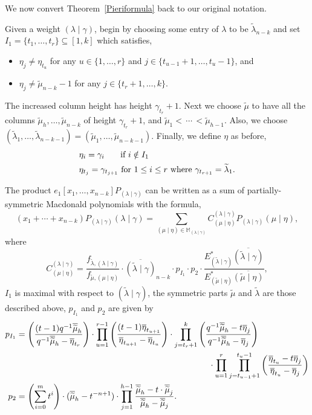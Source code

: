 \documentclass[ALCO]{cedram}
\newcommand{\Estar}[1]{E^*_{#1}}
\newcommand{\PP}{P_{(\lambda \mid \gamma)}}
\newcommand{\MMM}{\mathbb{M}_{\lambdagamma}}
\newcommand{\nudom}{{( \lambda \mid \gamma )}}
\newcommand{\lambdagamma}{{\nudom}}
\newcommand{\mueta}{{(\mu \mid \eta)}}
\newcommand{\mutilde}{{\widetilde{\mu}}}
\newcommand{\lambdatilde}{{\widetilde{\lambda}}}
\newcommand{\lambdatildegamma}{{(\lambdatilde \mid \gamma)}}
\newcommand{\mutildeeta}{{(\mutilde \mid \eta)}}
\newcommand{\hIone}{h}
\begin{document}
We now convert Theorem~\ref{Pieriformula} back to our original notation.

Given a weight $\lambdagamma$, begin by choosing some entry of $\lambda$ to be $\lambdatilde_{n-k}$ and set $I_1 = \{t_1, \dotsc, t_r\} \subseteq [1,k]$ which satisfies, 
\begin{itemize}
    \item $\eta_j \neq \eta_{t_u}$ for any $u \in \{1,\dotsc, r\}$ and $j \in \{t_{u-1}+1,\dotsc, t_{u}-1\}$, and
    \item $\eta_j \neq \mutilde_{n-k}-1$ for any $j \in \{t_r+1, \dotsc, k\}$.
\end{itemize}
The increased column height has height $\gamma_{t_r}+1$. Next we choose $\mutilde$ to have all the columns $\mutilde_{h} ,\dotsc, \mutilde_{n-k}$ of height $\gamma_{t_r}+1$, and $\mutilde_1 < \, \dotsm \, < \mutilde_{h-1}$. Also, we choose $(\lambdatilde_1, \dotsc, \lambdatilde_{n-k-1}) = (\mutilde_1, \dotsc, \mutilde_{n-k-1})$. Finally, we define $\eta$ as before,
 \begin{align}
     &\eta_i = \gamma_i \hspace*{.55cm}\text{ if } i\notin I_1\nonumber \\
     &\eta_{t_j}=\gamma_{t_{j+1}} \text{ for } 1\leq i \leq r \text{ where } \gamma_{t_{r+1}} = \lambdatilde_1.\label{eta}
 \end{align}

\begin{coro}\label{ourconventions}
 The product $e_1[x_1,\dotsc, x_{n-k}] \PP$ can be written as a sum of partially-symmetric Macdonald polynomials with the formula,
\[ (x_1 + \dotsm + x_{n-k})\PP{\lambdagamma} = \sum_{\mueta \in \MMM} C^{\lambdagamma}_{\mueta} \PP{\mueta},\]
where
\[C^{\lambdagamma}_{\mueta} = \frac{f_{\lambdatilde,\lambdagamma}}{f_{\mutilde,\mueta}} \cdot \overline{\lambdatildegamma}_{n-k} \cdot p_{I_1} \cdot p_{2}\cdot \frac{\Estar{\lambdatildegamma}\overline{\lambdatildegamma}}{\Estar{\mutildeeta}\overline{\mutildeeta}}, \]
$I_1$ is maximal with respect to $\lambdatildegamma$, the symmetric parts $\mutilde$ and $\lambdatilde$ are those described above, $p_{I_1}$ and $p_{2}$ are given by
\begin{align*}
p_{I_1} &= \left(\frac{(t-1)q^{-1} \overline{\mutilde}_{\hIone}}{q^{-1} \overline{\mutilde}_{\hIone}-\overline{\eta}_{t_r}}\right) \cdot \prod_{u=1}^{r-1} \left(\frac{(t-1) \overline{\eta}_{t_{u+1}}}{ \overline{\eta}_{t_{u+1}}-\overline{\eta}_{t_{u}}} \right) \cdot \prod_{j=t_r+1}^{k} \left( \frac{q^{-1} \overline{\mutilde}_{\hIone} - t \overline{\eta}_j}{q^{-1} \overline{\mutilde}_{\hIone} -  \overline{\eta}_j}\right) \\ & \hspace*{8cm} \cdot  \prod_{u=1}^{r} \prod_{j=t_{u-1}+1}^{t_{u}-1} \left( \frac{\overline{\eta}_{t_u} - t \overline{\eta}_j}{ \overline{\eta}_{t_{u}} -  \overline{\eta}_j} \right)\\
p_{2}&=\left( \sum_{i=0}^{m} t^i \right)\cdot (\overline{\mutilde}_{\hIone} - t^{-n+1}) \cdot \prod_{j=1}^{\hIone-1} \frac{\overline{\mutilde}_{\hIone} - t \cdot \overline{\mutilde}_j}{\overline{\mutilde}_{\hIone} - \overline{\mutilde}_j}.
\end{align*}
\end{coro}
\end{document}
